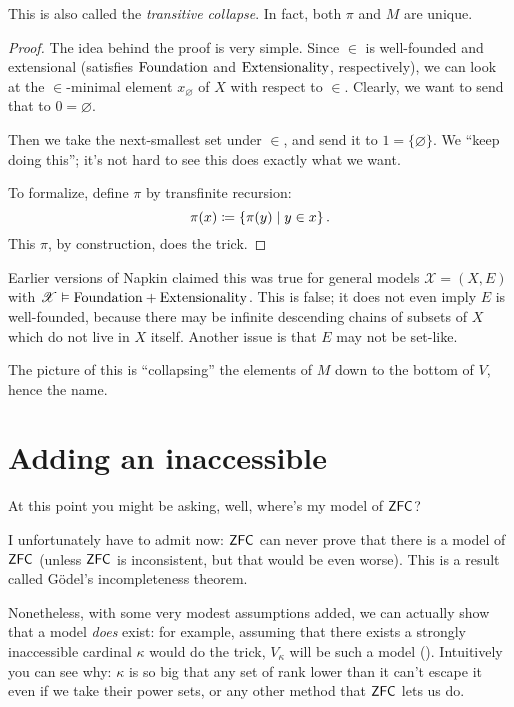 This is also called the \emph{transitive collapse}.
In fact, both $\pi$ and $M$ are unique.

\begin{proof}
	The idea behind the proof is very simple.
	Since $\in$ is well-founded and extensional
	(satisfies $\mathrm{Foundation}$ and $\mathrm{Extensionality}$, respectively),
	we can look at the $\in$-minimal element $x_\varnothing$
	of $X$ with respect to $\in$.
	Clearly, we want to send that to $0 = \varnothing$.

	Then we take the next-smallest set under $\in$, and send it to $1 = \{\varnothing\}$.
	We ``keep doing this''; it's not hard to see this does exactly what we want.

	To formalize, define $\pi$ by transfinite recursion:
	\[ \pi(x) \coloneqq \left\{ \pi(y) \mid y \in x \right\}. \]
	This $\pi$, by construction, does the trick.
\end{proof}

\begin{remark}
	Earlier versions of Napkin claimed this was true for general models
	$\mathscr X = (X, E)$ with $\mathscr X \vDash \mathrm{Foundation} + \mathrm{Extensionality}$.
	This is false; it does not even imply $E$ is well-founded,
	because there may be infinite descending chains of subsets of $X$
	which do not live in $X$ itself.
	Another issue is that $E$ may not be set-like.
\end{remark}

The picture of this is ``collapsing'' the elements of $M$ down
to the bottom of $V$, hence the name.


\section{Adding an inaccessible}
At this point you might be asking, well, where's my model of $\mathsf{ZFC}$?

I unfortunately have to admit now: $\mathsf{ZFC}$ can never prove that there is a model of $\mathsf{ZFC}$
(unless $\mathsf{ZFC}$ is inconsistent, but that would be even worse).
This is a result called G\"odel's incompleteness theorem.

Nonetheless, with some very modest assumptions added,
we can actually show that a model \emph{does} exist:
for example, assuming that there exists a strongly inaccessible cardinal $\kappa$ would do the trick,
$V_\kappa$ will be such a model ().
Intuitively you can see why: $\kappa$ is so big that any set of rank lower than it can't escape it
even if we take their power sets, or any other method that $\mathsf{ZFC}$ lets us do.

